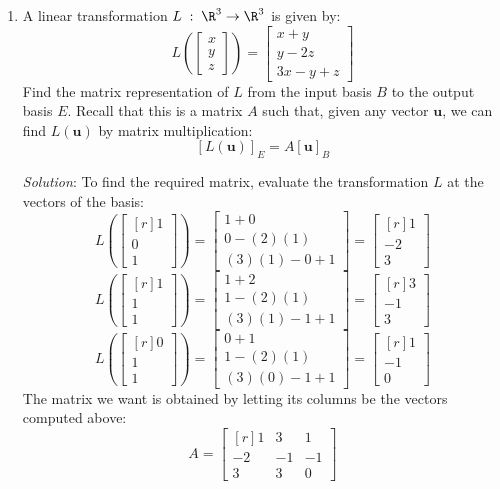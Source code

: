\documentclass[12pt]{article}
\begin{document}
\begin{enumerate}
\item A linear transformation $L\;:\;\R^3\to\R^3$ is given by:
\[
L\left(\begin{bmatrix}x\\y\\z\end{bmatrix}\right)=\begin{bmatrix}x+y\\y-2z\\3x-y+z\end{bmatrix}
\]
Find the matrix representation of $L$ from the input basis $B$ to the output basis $E$. Recall that this is a matrix $A$ such that, given any vector $\mathbf{u}$,
we can find $L(\mathbf{u})$ by matrix multiplication:
\[
[L(\mathbf{u})]_E=A[\mathbf{u}]_B
\]

\emph{Solution}:
To find the required matrix, evaluate the transformation $L$ at the vectors of the basis:
\[
L\left(\begin{bmatrix*}[r] 1\\ 0\\ 1\end{bmatrix*}\right)=
\begin{bmatrix}1+0\\0-(2)(1)\\(3)(1)-0+1\end{bmatrix}=
\begin{bmatrix*}[r]1\\-2\\3\end{bmatrix*}
\]
\[
L\left(\begin{bmatrix*}[r] 1\\ 1\\ 1\end{bmatrix*}\right)=
\begin{bmatrix}1+2\\1-(2)(1)\\(3)(1)-1+1\end{bmatrix}=
\begin{bmatrix*}[r]3\\-1\\3\end{bmatrix*}
\]
\[
L\left(\begin{bmatrix*}[r] 0\\ 1\\ 1\end{bmatrix*}\right)=
\begin{bmatrix}0+1\\1-(2)(1)\\(3)(0)-1+1\end{bmatrix}=
\begin{bmatrix*}[r]1\\-1\\0\end{bmatrix*}
\]
The matrix we want is obtained by letting its columns be the vectors computed above:
\[
A = \begin{bmatrix*}[r]1&3&1\\-2&-1&-1\\3&3&0\end{bmatrix*}
\]
\proofend


\end{enumerate}
\end{document}
